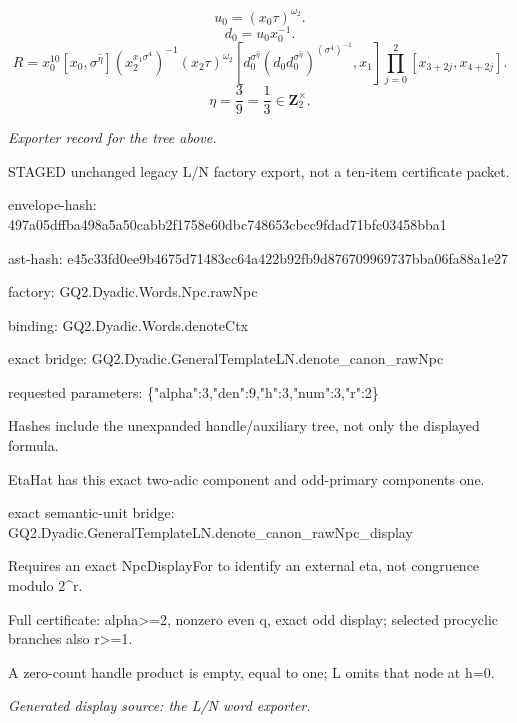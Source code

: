 \[u_0=(x_0\tau)^{\omega_2}.\]
\[d_0=u_0x_0^{-1}.\]
\[R=x_0^{10}[x_0,\sigma^{\widehat{\eta}}](x_2^{x_1\sigma^4})^{-1}(x_2\tau)^{\omega_2}[d_0^{\sigma^{\widehat{\eta}}}(d_0d_0^{\sigma^{\widehat{\eta}}})^{(\sigma^4)^{-1}},x_1]\prod_{j=0}^2[x_{3+2j},x_{4+2j}].\]
\[\eta=\frac{3}{9}=\frac{1}{3}\in\mathbf Z_2^\times.\]
\par\noindent\emph{Exporter record for the tree above.}
\par\noindent STAGED unchanged legacy L/N factory export, not a ten-item certificate packet.
\par\noindent envelope-hash: 497a05dffba498a5a50cabb2f1758e60dbc748653cbcc9fdad71bfc03458bba1
\par\noindent ast-hash: e45c33fd0ee9b4675d71483cc64a422b92fb9d876709969737bba06fa88a1e27
\par\noindent factory: GQ2.Dyadic.Words.Npc.rawNpc
\par\noindent binding: GQ2.Dyadic.Words.denoteCtx
\par\noindent exact bridge: GQ2.Dyadic.GeneralTemplateLN.denote\_canon\_rawNpc
\par\noindent requested parameters: \{"alpha":3,"den":9,"h":3,"num":3,"r":2\}
\par\noindent Hashes include the unexpanded handle/auxiliary tree, not only the displayed formula.
\par\noindent EtaHat has this exact two-adic component and odd-primary components one.
\par\noindent exact semantic-unit bridge: GQ2.Dyadic.GeneralTemplateLN.denote\_canon\_rawNpc\_display
\par\noindent Requires an exact NpcDisplayFor to identify an external eta, not congruence modulo 2\textasciicircum{}r.
\par\noindent Full certificate: alpha>=2, nonzero even q, exact odd display; selected procyclic branches also r>=1.
\par\noindent A zero-count handle product is empty, equal to one; L omits that node at h=0.
\par\noindent\emph{Generated display source: the L/N word exporter.}
